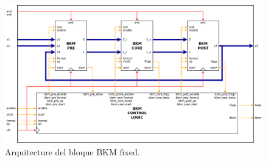 \documentclass[10pt,a4paper]{book}
\begin{document}
      \begin{figure}[h]
         \centering
         \includegraphics[width=1.0\textwidth]{./figures/bkm_fixed.png}
         \caption{Arquitecture del bloque BKM fixed.}
         \label{fig:bkm_fixed}
      \end{figure}
\end{document}
